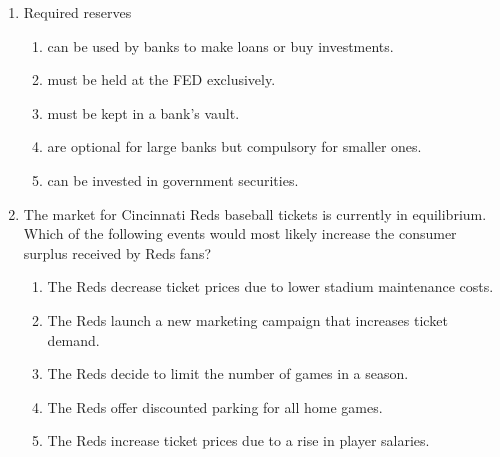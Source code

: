 \documentclass[12pt]{article}
\begin{document}
\begin{enumerate}[label=\arabic*.]
\begin{enumerate}[label=(\alph*)]
    \item \ensuremath{\hat{y}}\_t = \ensuremath{\hat{\alpha}}x\_t + \ensuremath{\hat{\beta}}x\_t
    \item y\_t = \ensuremath{\hat{\alpha}} + \ensuremath{\hat{\beta}}x\_t + \ensuremath{\hat{u}}\_t
    \item \ensuremath{\hat{y}}\_t = \ensuremath{\hat{\alpha}} + \ensuremath{\hat{\beta}}
\end{enumerate}
\item Required reserves
\begin{enumerate}[label=(\alph*)]
    \item can be used by banks to make loans or buy investments.
    \item must be held at the FED exclusively.
    \item must be kept in a bank's vault.
    \item are optional for large banks but compulsory for smaller ones.
    \item can be invested in government securities.
\end{enumerate}
\item The market for Cincinnati Reds baseball tickets is currently in equilibrium. Which of the following events would most likely increase the consumer surplus received by Reds fans?
\begin{enumerate}[label=(\alph*)]
    \item The Reds decrease ticket prices due to lower stadium maintenance costs.
    \item The Reds launch a new marketing campaign that increases ticket demand.
    \item The Reds decide to limit the number of games in a season.
    \item The Reds offer discounted parking for all home games.
    \item The Reds increase ticket prices due to a rise in player salaries.
\end{enumerate}
\end{enumerate}
\end{document}
